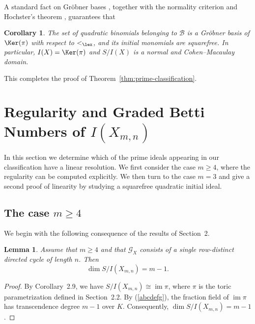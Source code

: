 \documentclass[12pt]{amsart}
\numberwithin{equation}{section}
\newcommand{\Bc}{\mathcal{B}}
\newtheorem{Lemma}[Theorem]{Lemma}
\newtheorem{Corollary}[Theorem]{Corollary}
\begin{document}
A standard fact on Gr\"obner bases
\cite[Proposition~2.2.5]{HHgtm260},
together with the normality criterion
\cite[Proposition~13.15]{Stu}
and Hochster's theorem
\cite[Theorem~1]{Hochster1972},
guarantees that

\begin{Corollary}
The set of quadratic binomials belonging to $\Bc$
is a Gr\"obner basis of $\Ker(\pi)$ with respect
to $<_{\lex}$, and its initial monomials are
squarefree. In particular, $I(X)=\Ker(\pi)$
and $S/I(X)$ is a normal and Cohen--Macaulay domain.
\end{Corollary}

This completes the proof of Theorem~\ref{thm:prime-classification}.



\section{Regularity and Graded Betti Numbers of $I(X_{m,n})$}

In this section we determine which of the prime ideals appearing in
our classification have a linear resolution. We first consider the
case $m\geq 4$, where the regularity can be computed explicitly.
We then turn to the case $m=3$ and give a second proof of linearity by studying a squarefree quadratic initial ideal.


\subsection{The case $m\geq 4$}

We begin with the following consequence of the results of Section~2.

\begin{Lemma}\label{lem:dimension}
Assume that $m\geq 4$ and that $\mathcal G_X$ consists of a single
row-distinct directed cycle of length $n$. Then
\[
\dim S/I(X_{m,n})=m-1.
\]
\end{Lemma}

\begin{proof}
By Corollary~2.9, we have
$S/I(X_{m,n})\cong\operatorname{im}\pi$, where
$\pi$ is the toric parametrization defined in
Section~2.2. By (\ref{abcdefg}), the fraction field of
$\operatorname{im}\pi$ has transcendence degree $m-1$
over $K$. Consequently,
$\dim S/I(X_{m,n})=m-1$.
\end{proof}
\end{document}
